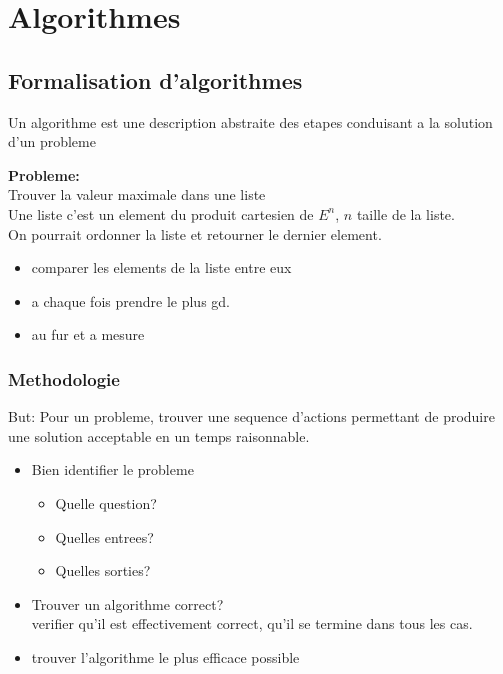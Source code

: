 \documentclass[../main.tex]{subfiles}
\begin{document}
\chapter{Algorithmes}
\section{Formalisation d'algorithmes}
\begin{defn}[Algorithme]
	Un algorithme est une description abstraite des etapes conduisant a la solution d'un probleme
\end{defn}

\begin{exemple}
	\textbf{Probleme:}\\
	Trouver la valeur maximale dans une liste\\
	Une liste c'est un element du produit cartesien de $E^{n}$, $n$ taille de la liste.\\
	On pourrait ordonner la liste et retourner le dernier element.\\
	\begin{itemize}
		\item comparer les elements de la liste entre eux\\
		\item a chaque fois prendre le plus gd.\\
		\item au fur et a mesure
	\end{itemize}
	
\end{exemple}

\subsection{Methodologie}
But: Pour un probleme, trouver une sequence d'actions permettant de produire une solution acceptable en un temps raisonnable.
\begin{itemize}
	\item Bien identifier le probleme
		\begin{itemize}
			\item Quelle question?\\
			\item Quelles entrees?\\
			\item Quelles sorties?
		\end{itemize}
	\item Trouver un algorithme correct?\\
		verifier qu'il est effectivement correct, qu'il se termine dans tous les cas.\\
	\item trouver l'algorithme le plus efficace possible
\end{itemize}
\end{document}
